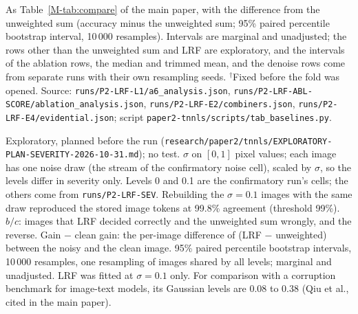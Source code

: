 \documentclass[journal,onecolumn]{IEEEtran}
\theoremstyle{plain}
\begin{document}
\begin{table}[!htbp]
\centering
\caption{Exploratory Comparison of Ways of Combining the Same Per-Token Evidence: Accuracy and Difference From the Unweighted Sum on the 450 Fresh-Fold Images}
\label{stab:compare}
\scriptsize
\setlength{\tabcolsep}{2pt}
\resizebox{\textwidth}{!}{}

\vspace{2pt}
\parbox{\textwidth}{\scriptsize As Table~\ref{M-tab:compare} of the main paper, with the difference from the unweighted sum (accuracy minus the unweighted sum; 95\% paired percentile bootstrap
interval, 10\,000 resamples). Intervals are marginal and unadjusted; the rows other than the unweighted sum and LRF are exploratory, and the intervals of the ablation rows, the median and trimmed mean, and the denoise
rows come from separate runs with their own resampling seeds. $^{\dagger}$Fixed before the fold was opened. Source: \nolinkurl{runs/P2-LRF-L1/a6_analysis.json},
\nolinkurl{runs/P2-LRF-ABL-SCORE/ablation_analysis.json}, \nolinkurl{runs/P2-LRF-E2/combiners.json}, \nolinkurl{runs/P2-LRF-E4/evidential.json}; script \nolinkurl{paper2-tnnls/scripts/tab_baselines.py}.}
\end{table}

\begin{table}[!htbp]
\centering
\caption{Exploratory Gaussian-Noise Severity Sweep of the Frozen LRF and the Unweighted Sum on the 450 Fresh-Fold Images}
\label{stab:severity}
\scriptsize
\setlength{\tabcolsep}{3pt}
\resizebox{\textwidth}{!}{}

\vspace{2pt}
\parbox{\textwidth}{\scriptsize Exploratory, planned before the run (\nolinkurl{research/paper2/tnnls/EXPLORATORY-PLAN-SEVERITY-2026-10-31.md}); no test. $\sigma$ on $[0,1]$ pixel values; each image has one noise draw (the stream of the confirmatory noise cell), scaled by $\sigma$, so the levels differ in severity only. Levels 0 and 0.1 are the confirmatory run's cells; the others come from \nolinkurl{runs/P2-LRF-SEV}. Rebuilding the $\sigma=0.1$ images with the same draw reproduced the stored image tokens at 99.8\% agreement (threshold 99\%). $b/c$: images that LRF decided correctly and the unweighted sum wrongly, and the reverse. Gain $-$ clean gain: the per-image difference of (LRF $-$ unweighted) between the noisy and the clean image. 95\% paired percentile bootstrap intervals, 10\,000 resamples, one resampling of images shared by all levels; marginal and unadjusted. LRF was fitted at $\sigma=0.1$ only. For comparison with a corruption benchmark for image-text models, its Gaussian levels are 0.08 to 0.38 (Qiu et al., cited in the main paper).}
\end{table}
\end{document}
